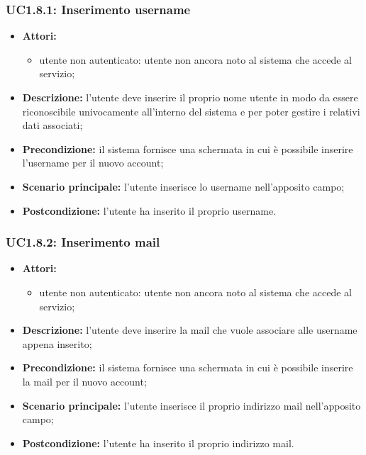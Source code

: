 \subsubsection{UC1.8.1: Inserimento username}
\begin{itemize}
	\item \textbf{Attori:}
	\begin{itemize}
		\item utente non autenticato: utente non ancora noto al sistema che accede al servizio;
	\end{itemize}
	\item \textbf{Descrizione:} l'utente deve inserire il proprio nome utente in modo da essere riconoscibile univocamente all'interno del sistema e per poter gestire i relativi dati associati;
	\item \textbf{Precondizione:} il sistema fornisce una schermata in cui è possibile inserire l'username per il nuovo account;
	\item \textbf{Scenario principale:} l'utente inserisce lo username nell'apposito campo;
	\item \textbf{Postcondizione:} l'utente ha inserito il proprio username.
\end{itemize}

\subsubsection{UC1.8.2: Inserimento mail}
\begin{itemize}
	\item \textbf{Attori:}
	\begin{itemize}
		\item utente non autenticato: utente non ancora noto al sistema che accede al servizio;
	\end{itemize}
	\item \textbf{Descrizione:} l'utente deve inserire la mail che vuole associare alle username appena inserito;
	\item \textbf{Precondizione:} il sistema fornisce una schermata in cui è possibile inserire la mail per il nuovo account;
	\item \textbf{Scenario principale:} l'utente inserisce il proprio indirizzo mail nell'apposito campo;
	\item \textbf{Postcondizione:} l'utente ha inserito il proprio indirizzo mail.
\end{itemize}

